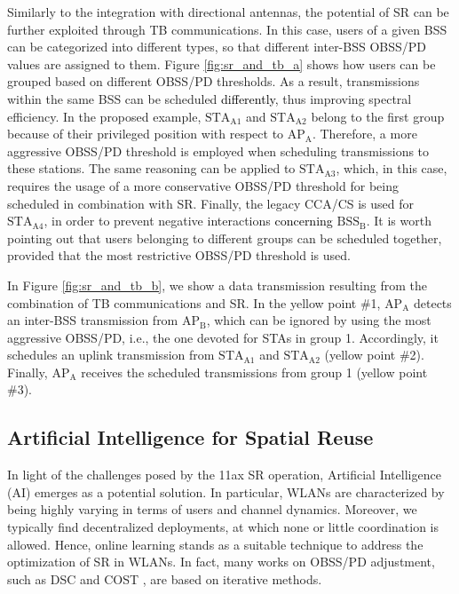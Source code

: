 \documentclass[preprint,12pt]{elsarticle}
\theoremstyle{plain}
\begin{document}
Similarly to the integration with directional antennas, the potential of SR can be further exploited through TB communications. In this case, users of a given BSS can be categorized into different types, so that different inter-BSS OBSS/PD values are assigned to them. Figure \ref{fig:sr_and_tb_a} shows how users can be grouped based on different OBSS/PD thresholds. As a result, transmissions within the same BSS can be scheduled \textcolor{black}{differently}, thus improving spectral efficiency. In the proposed example, $\text{STA}_\text{A1}$ and $\text{STA}_\text{A2}$ belong to the first group because of their privileged position with respect to $\text{AP}_\text{A}$. Therefore, a more aggressive OBSS/PD threshold is employed when scheduling transmissions to these stations. The same reasoning can be applied to $\text{STA}_\text{A3}$, which, in this case, requires the usage of a more conservative OBSS/PD threshold for being scheduled in combination with SR. Finally, the legacy CCA/CS is used for $\text{STA}_\text{A4}$, in order to prevent negative interactions \textcolor{black}{concerning} $\text{BSS}_\text{B}$. It is worth pointing out that users belonging to different groups can be scheduled together, provided that the most restrictive OBSS/PD threshold is used. 

In Figure \ref{fig:sr_and_tb_b}, we show a data transmission resulting from the combination of TB communications and SR. In the yellow point \#1, $\text{AP}_\text{A}$ detects an inter-BSS transmission from $\text{AP}_\text{B}$, which can be ignored by using the most aggressive OBSS/PD, i.e., the one devoted for STAs in group 1. Accordingly, it schedules an uplink transmission from $\text{STA}_\text{A1}$ and $\text{STA}_\text{A2}$ (yellow point \#2). Finally, $\text{AP}_\text{A}$ receives the scheduled transmissions from group 1 (yellow point \#3).

\subsection{Artificial Intelligence for Spatial Reuse}
In light of the challenges posed by the 11ax SR operation, Artificial Intelligence (AI) emerges as a potential solution. In particular, WLANs are characterized by being highly varying in terms of users and channel dynamics. Moreover, we typically find decentralized deployments, at which none or little coordination is allowed. Hence, online learning stands as a suitable technique to address the optimization of SR in WLANs. In fact, many works on OBSS/PD adjustment, such as DSC \cite{smith2017dynamic} and COST \cite{selinis2018control}, are based on iterative methods. 
\end{document}

